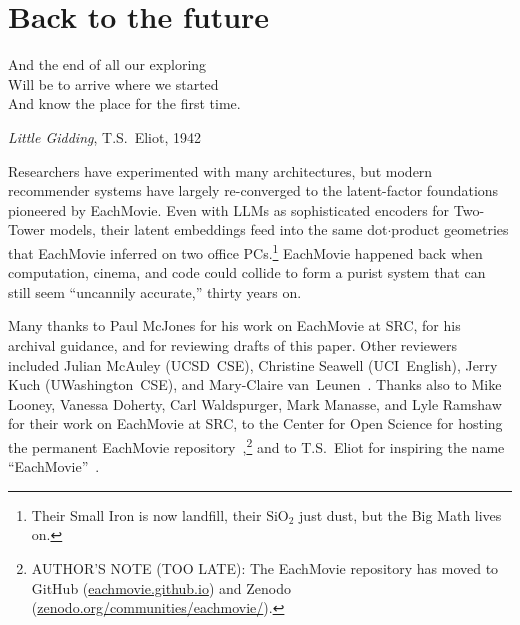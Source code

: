 \documentclass[sigconf,authorversion,screen,microtype={protrusion=true,expansion,kerning,spacing}]{acmart}
\begin{document}
\section{Back to the future}
\epigraph{\raggedleft{} And the end of all our exploring \\ Will be to arrive where we started \\ And know the place for the first time.}{\textit{Little Gidding}, T.S.~Eliot, 1942}


Researchers have experimented with many architectures, but modern recommender systems have largely re-converged to the latent-factor foundations pioneered by EachMovie. Even with LLMs as sophisticated encoders for Two-Tower models, their latent embeddings feed into the same dot$\cdot$\allowbreak{}product geometries that EachMovie inferred on two office PCs.\footnote{Their Small Iron is now landfill, their  $\text{SiO}_2$ just dust, but the Big Math lives on.} EachMovie happened back when computation, cinema, and code could collide to form a purist system that can still seem ``uncannily accurate,'' thirty years on.

\begin{acks}
  Many thanks to Paul McJones for his work on EachMovie at SRC, for his archival guidance, and for reviewing drafts of this paper. Other reviewers included Julian McAuley (UCSD~CSE), Christine Seawell (UCI~English), Jerry Kuch (UWashington~CSE), and Mary-Claire van~Leunen~\cite{VanLeunen92}. %
Thanks also to Mike Looney, Vanessa Doherty, Carl Waldspurger, Mark Manasse, and Lyle Ramshaw for their work on EachMovie at SRC, to the Center for Open Science for hosting the permanent EachMovie repository~\cite{EachMovieOSF},\footnote{AUTHOR'S NOTE (TOO LATE): The EachMovie repository has moved to GitHub (\href{https://eachmovie.github.io}{eachmovie.github.io}) and Zenodo (\href{https://zenodo.org/communities/eachmovie/}{zenodo.org/communities/eachmovie/}).} and to T.S.~Eliot for inspiring the name ``EachMovie''~\cite{Eliot1917}.
\end{acks}


\nocite{eliot1942littlegidding}

\end{document}

